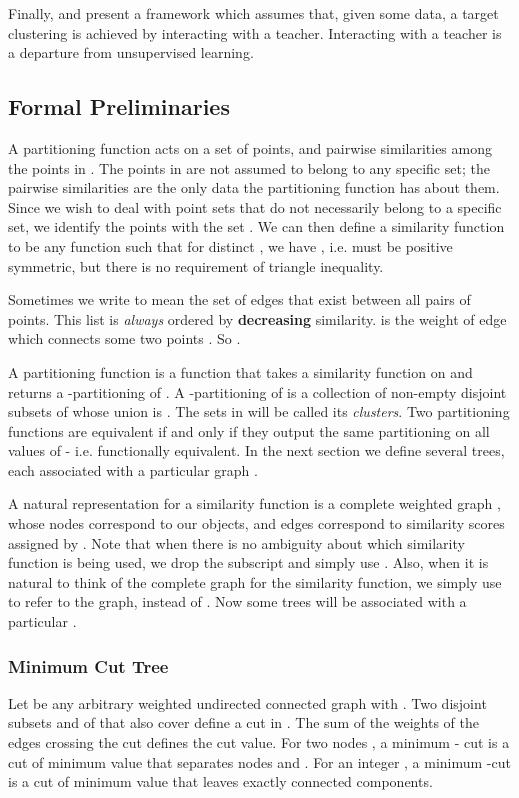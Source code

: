 \documentclass[twoside,11pt]{article}
\begin{document}
Finally, \cite{BBV08} and \cite{awasthisupervised} present a framework which assumes that, given some data, 
a target clustering is achieved by interacting with a teacher. Interacting with a teacher is a departure from unsupervised learning.

\subsection{Formal Preliminaries} \label{formal}

A partitioning function acts on a set  of  points, and pairwise similarities among the points in . The points in  are not assumed to belong to any specific set; the pairwise similarities are the only data the partitioning function has about them. Since we wish to deal with point sets that do not necessarily belong to a specific set, we identify the points with the set . We can then define a similarity function to be any function   such that for distinct , we have , i.e.  must be positive symmetric, but there is no requirement of triangle inequality.

Sometimes we write  to mean the set of edges that exist between all pairs of  points. This list is \textit{always} ordered by \textbf{decreasing} similarity.  is the weight of edge  which connects some two points . So .

A partitioning function is a function  that takes a similarity function  on  and returns a -partitioning of . A -partitioning of  is a collection of  non-empty disjoint subsets of  whose union is . The sets in  will be called its \textit{clusters}. Two partitioning functions are equivalent if and only if they output the same partitioning on all values of  - i.e. functionally equivalent. In the next section we define several trees, each associated with a particular graph .

A natural representation for a similarity function  is a complete weighted graph ,
whose  nodes correspond to our objects, and edges correspond to similarity scores assigned by .  Note that when there is no ambiguity about which similarity function is being used, we drop the subscript  and simply use . Also, when it is natural to think of the complete graph for the similarity function, we simply use  to refer to the graph, instead of . Now some trees will be associated with a particular .

\subsubsection{Minimum Cut Tree}
\label{mctdesc}
Let  be any arbitrary weighted undirected connected graph with .
Two disjoint subsets  and  of  that also cover  define a cut
in . The sum of the weights of the edges crossing the cut defines the cut value. For two nodes , a minimum - cut is a cut of minimum value that separates nodes  and . For an integer , a minimum -cut is a cut of minimum value that  leaves exactly  connected components.
\end{document}
